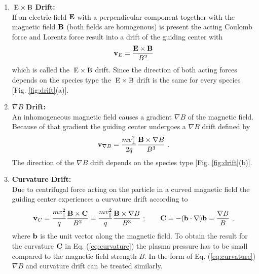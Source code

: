 \begin{enumerate}
    \item {\boldmath $\mathrm{\:E}\times\mathrm{B}$} \textbf{Drift:}\\
    If an electric field $\boldsymbol{\mathbf{E}}$ with a perpendicular component together with the magnetic field $\boldsymbol{\mathbf{B}}$ (both fields are homogenous) is present the acting Coulomb force and Lorentz force result into a drift of the guiding center with
    \begin{gather}
        \boldsymbol{\mathbf{v}}_{E} = \frac{\boldsymbol{\mathbf{E}}\times\boldsymbol{\mathbf{B}}}{B^2}
        \label{eq:exb}
    \end{gather}
    which is called the $\mathrm{\:E}\times\mathrm{B}$ drift. Since the direction of both acting forces depends on the species type the $\mathrm{\:E}\times\mathrm{B}$ drift is the same for every species [Fig. \ref{fig:drift}(a)].
    \item {\boldmath $\nabla B$} \textbf{Drift:}\\
    An inhomogeneous magnetic field causes a gradient $\nabla B$ of the magnetic field. Because of that gradient the guiding center undergoes a $\nabla B$ drift defined by
    \begin{gather}
        \boldsymbol{\mathbf{v}}_{\nabla B} = \frac{m v^2_{\perp}}{2 q}\frac{\boldsymbol{\mathbf{B}}\times \nabla B}{B^3}~.
        \label{eq:gradB}
    \end{gather}
    The direction of the $\nabla B$ drift depends on the species type [Fig. \ref{fig:drift}(b)].
    \item \textbf{Curvature Drift:}\\
    Due to centrifugal force acting on the particle in a curved magnetic field the guiding center experiences a curvature drift according to
    \begin{gather}
        \boldsymbol{\mathbf{v}}_{C} = \frac{m v^2_{\parallel}}{q}\frac{\boldsymbol{\mathbf{B}}\times \boldsymbol{\mathbf{C}}}{B^2} = \frac{m v^2_{\parallel}}{q} \frac{\boldsymbol{\mathbf{B}}\times \nabla B}{B^3}~;\qquad\boldsymbol{\mathbf{C}} = -(\boldsymbol{\mathbf{b}}\cdot \nabla)\boldsymbol{\mathbf{b}} = \frac{\nabla B}{B}~,
        \label{eq:curvature}
    \end{gather}
    where $\boldsymbol{\mathbf{b}}$ is the unit vector along the magnetic field. To obtain the result for the curvature $\boldsymbol{\mathbf{C}}$ in Eq. (\ref{eq:curvature}) the plasma pressure has to be small compared to the magnetic field strength $B$. In the form of Eq. (\ref{eq:curvature}) $\nabla B$ and curvature drift can be treated similarly.
\end{enumerate}

\newpage

